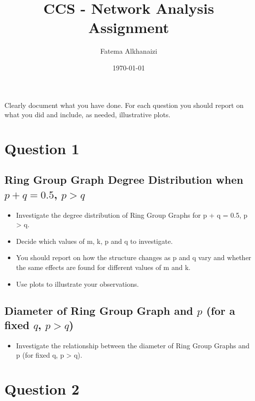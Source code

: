 \documentclass[11pt,a4paper,notitlepage]{article}
\title{CCS - Network Analysis Assignment}
\author{Fatema Alkhanaizi}
\date{\today}
\begin{document}
\maketitle

\noindent
Clearly document what you have done. For each question you should report on what you did and include, as needed, illustrative plots.

\section*{Question 1}
\subsection*{Ring Group Graph Degree Distribution when $p + q = 0.5$, $p > q$}
\begin{itemize}
    \item Investigate the degree distribution of Ring Group Graphs for p + q = 0.5, p > q. 
    \item Decide which values of m, k, p and q to investigate. 
    \item You should report on how the structure changes as p and q vary and whether the same effects are found for different values of m and k.
    \item Use plots to illustrate your observations.
\end{itemize}

 
\subsection*{Diameter of Ring Group Graph and $p$ (for a fixed $q$, $p > q$)}
\begin{itemize}
    \item Investigate the relationship between the diameter of Ring Group Graphs and p (for fixed q, p > q). 
\end{itemize}

\section*{Question 2}
\end{document}
